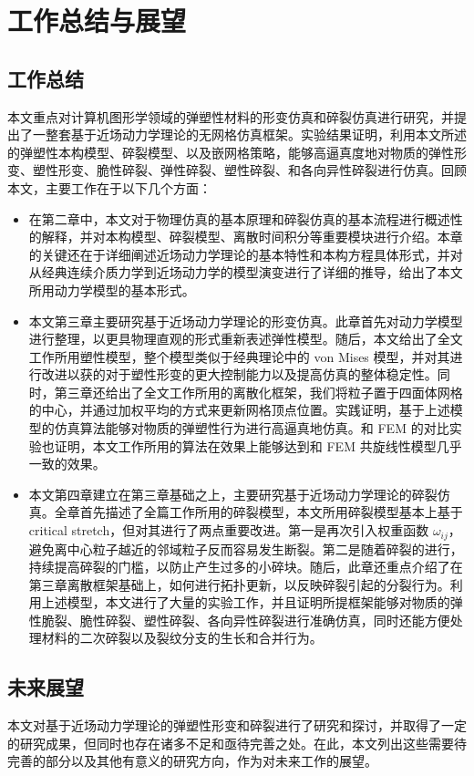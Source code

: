 ﻿\chapter{工作总结与展望}
\section{工作总结}
本文重点对计算机图形学领域的弹塑性材料的形变仿真和碎裂仿真进行研究，并提出了一整套基于近场动力学理论的无网格仿真框架。实验结果证明，利用本文所述的弹塑性本构模型、碎裂模型、以及嵌网格策略，能够高逼真度地对物质的弹性形变、塑性形变、脆性碎裂、弹性碎裂、塑性碎裂、和各向异性碎裂进行仿真。回顾本文，主要工作在于以下几个方面：

\begin{itemize}
  \item 在第二章中，本文对于物理仿真的基本原理和碎裂仿真的基本流程进行概述性的解释，并对本构模型、碎裂模型、离散时间积分等重要模块进行介绍。本章的关键还在于详细阐述近场动力学理论的基本特性和本构方程具体形式，并对从经典连续介质力学到近场动力学的模型演变进行了详细的推导，给出了本文所用动力学模型的基本形式。
  \item 本文第三章主要研究基于近场动力学理论的形变仿真。此章首先对动力学模型进行整理，以更具物理直观的形式重新表述弹性模型。随后，本文给出了全文工作所用塑性模型，整个模型类似于经典理论中的 von Mises 模型，并对其进行改进以获的对于塑性形变的更大控制能力以及提高仿真的整体稳定性。同时，第三章还给出了全文工作所用的离散化框架，我们将粒子置于四面体网格的中心，并通过加权平均的方式来更新网格顶点位置。实践证明，基于上述模型的仿真算法能够对物质的弹塑性行为进行高逼真地仿真。和 FEM 的对比实验也证明，本文工作所用的算法在效果上能够达到和 FEM 共旋线性模型几乎一致的效果。
  \item 本文第四章建立在第三章基础之上，主要研究基于近场动力学理论的碎裂仿真。全章首先描述了全篇工作所用的碎裂模型，本文所用碎裂模型基本上基于 critical stretch，但对其进行了两点重要改进。第一是再次引入权重函数 $\omega_{ij}$，避免离中心粒子越近的邻域粒子反而容易发生断裂。第二是随着碎裂的进行，持续提高碎裂的门槛，以防止产生过多的小碎块。随后，此章还重点介绍了在第三章离散框架基础上，如何进行拓扑更新，以反映碎裂引起的分裂行为。利用上述模型，本文进行了大量的实验工作，并且证明所提框架能够对物质的弹性脆裂、脆性碎裂、塑性碎裂、各向异性碎裂进行准确仿真，同时还能方便处理材料的二次碎裂以及裂纹分支的生长和合并行为。
\end{itemize}

\section{未来展望}
本文对基于近场动力学理论的弹塑性形变和碎裂进行了研究和探讨，并取得了一定的研究成果，但同时也存在诸多不足和亟待完善之处。在此，本文列出这些需要待完善的部分以及其他有意义的研究方向，作为对未来工作的展望。

